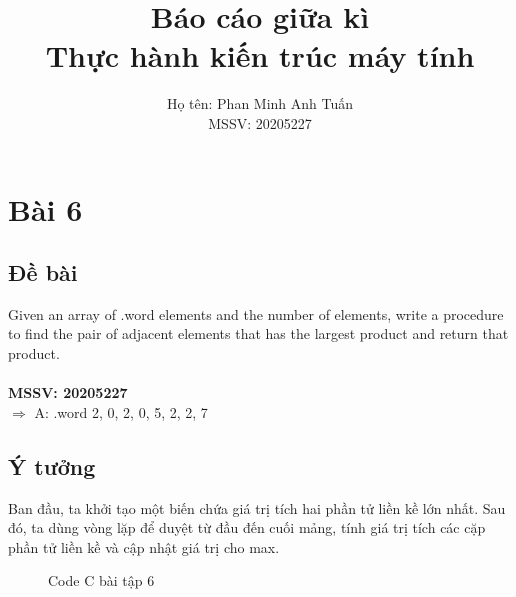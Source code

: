 \documentclass[a4paper,12pt]{article}
\title{\textbf{Báo cáo giữa kì \\ Thực hành kiến trúc máy tính}}
\author{Họ tên: Phan Minh Anh Tuấn \\ MSSV: 20205227}
\date{}
\begin{document}
	\maketitle
	\tableofcontents
	\newpage
\section{Bài 6}
\subsection{Đề bài}Given an array of .word elements and the number of elements, write a procedure to find the pair of adjacent elements that has the largest product and return that product. \\ \\
\textbf{MSSV: 20205227} \\
$\Rightarrow$ A: .word 2, 0, 2, 0, 5, 2, 2, 7
\subsection{Ý tưởng} Ban đầu, ta khởi tạo một biến chứa giá trị tích hai phần tử liền kề lớn nhất. Sau đó, ta dùng vòng lặp để duyệt từ đầu đến cuối mảng, tính giá trị tích các cặp phần tử liền kề và cập nhật giá trị cho max.
\begin{figure}[!h]
	\centerline{}
	\caption{Code C bài tập 6}
	\label{fig:bai6}
\end{figure}
\clearpage
\end{document}
